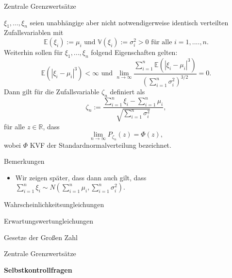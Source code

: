 \documentclass[
  8pt,
  ignorenonframetext,
]{beamer}
\providecommand{\tightlist}{%
  \setlength{\itemsep}{0pt}\setlength{\parskip}{0pt}}
\begin{document}
\begin{frame}{Zentrale Grenzwertsätze}
\protect\hypertarget{zentrale-grenzwertsuxe4tze-4}{}
\footnotesize
\begin{theorem}
\justifying
\normalfont
$\xi_1,...,\xi_n$ seien unabhängige aber nicht notwendigerweise identisch verteilten Zufallsvariablen mit
\begin{equation}
\mathbb{E}(\xi_i) := \mu_i \mbox{ und }
\mathbb{V}(\xi_i) := \sigma^2_i > 0
\mbox{ für alle } i = 1,....,n.
\end{equation}
Weiterhin sollen für $\xi_1,...,\xi_n$ folgend Eigenschaften gelten:
\begin{equation}
\mathbb{E}(|\xi_i - \mu_i|^3) < \infty \mbox{ und }
\lim_{n \to \infty} \frac{\sum_{i=1}^n \mathbb{E}\left(|\xi_i - \mu_i|^3\right)}{(\sum_{i=1}^n \sigma_i^2)^{3/2}} = 0.
\end{equation}
Dann gilt für die Zufallsvariable $\zeta_n$ definiert als
\begin{equation}
\zeta_n := \frac{\sum_{i=1}^n \xi_i - \sum_{i=1}^n \mu_i}{\sqrt{\sum_{i=1}^n \sigma_i^2}},
\end{equation}
für alle $z\in\mathbb{R}$, dass
\begin{equation}
\lim_{n \to \infty} P_{\zeta_n}(z) = \Phi(z),
\end{equation}
wobei $\Phi$ KVF der Standardnormalverteilung bezeichnet.
\end{theorem}

Bemerkungen

\begin{itemize}
\tightlist
\item
  Wir zeigen später, dass dann auch gilt, dass
  \(\sum_{i=1}^n \xi_i \sim N\left(\sum_{i=1}^n \mu_i, \sum_{i=1}^n \sigma_i^2\right)\).
\end{itemize}
\end{frame}

\begin{frame}{}
\protect\hypertarget{section-7}{}
\large
\vfill
{}

Wahrscheinlichkeitsungleichungen

Erwartungswertungleichungen

Gesetze der Großen Zahl

Zentrale Grenzwertsätze

\textbf{Selbstkontrollfragen} \vfill
\end{frame}
\end{document}
